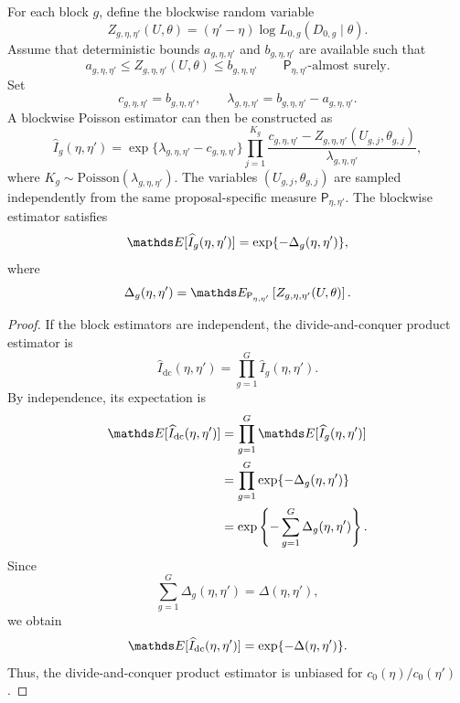 For each block $g$, define the blockwise random variable
\begin{equation}
    Z_{g,\eta,\eta'}(U,\theta)
    =
    (\eta'-\eta)\log L_{0,g}(D_{0,g}\mid\theta).
\end{equation}
Assume that deterministic bounds $a_{g,\eta,\eta'}$ and $b_{g,\eta,\eta'}$ are available such that
\begin{equation}
    a_{g,\eta,\eta'}
    \le
    Z_{g,\eta,\eta'}(U,\theta)
    \le
    b_{g,\eta,\eta'}
    \qquad
    \mathsf P_{\eta,\eta'}\text{-almost surely}.
\end{equation}
Set
\begin{equation}
    c_{g,\eta,\eta'}
    =
    b_{g,\eta,\eta'},
    \qquad
    \lambda_{g,\eta,\eta'}
    =
    b_{g,\eta,\eta'}-a_{g,\eta,\eta'}.
\end{equation}
A blockwise Poisson estimator can then be constructed as
\begin{equation}
    \widehat I_g(\eta,\eta')
    =
    \exp\{\lambda_{g,\eta,\eta'}-c_{g,\eta,\eta'}\}
    \prod_{j=1}^{K_g}
    \frac{
        c_{g,\eta,\eta'} -
        Z_{g,\eta,\eta'}(U_{g,j},\theta_{g,j})
    }{
        \lambda_{g,\eta,\eta'}
    },
\end{equation}
where $K_g\sim\mathrm{Poisson}(\lambda_{g,\eta,\eta'})$.
The variables $(U_{g,j},\theta_{g,j})$ are sampled independently from the same proposal-specific measure $\mathsf P_{\eta,\eta'}$.
The blockwise estimator satisfies
\begin{equation}
    \bE[\widehat I_g(\eta,\eta')]
    =
    \exp\{-\Delta_g(\eta,\eta')\},
\end{equation}
where
\begin{equation}
    \Delta_g(\eta,\eta')
    =
    \bE_{\mathsf P_{\eta,\eta'}}
    \left[
        Z_{g,\eta,\eta'}(U,\theta)
    \right].
\end{equation}

\begin{proof}
If the block estimators are independent, the divide-and-conquer product estimator is
\begin{equation}
    \widehat I_{\mathrm{dc}}(\eta,\eta')
    =
    \prod_{g=1}^{G}\widehat I_g(\eta,\eta').
\end{equation}
By independence, its expectation is
\begin{align}
    \bE[\widehat I_{\mathrm{dc}}(\eta,\eta')]
    &=
    \prod_{g=1}^{G}
    \bE[\widehat I_g(\eta,\eta')] \\
    &=
    \prod_{g=1}^{G}
    \exp\{-\Delta_g(\eta,\eta')\} \\
    &=
    \exp\left\{
        -\sum_{g=1}^{G}\Delta_g(\eta,\eta')
    \right\}.
\end{align}
Since
\begin{equation}
    \sum_{g=1}^{G}\Delta_g(\eta,\eta')
    =
    \Delta(\eta,\eta'),
\end{equation}
we obtain
\begin{equation}
    \bE[\widehat I_{\mathrm{dc}}(\eta,\eta')]
    =
    \exp\{-\Delta(\eta,\eta')\}.
\end{equation}
Thus, the divide-and-conquer product estimator is unbiased for $c_0(\eta)/c_0(\eta')$.
\end{proof}


